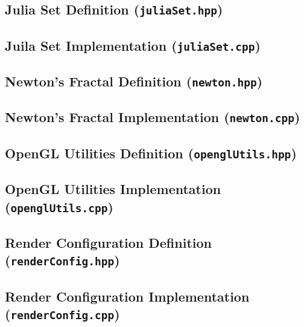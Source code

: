 \pagebreak

\subsection{Julia Set Definition (\texttt{juliaSet.hpp})}


\subsection{Juila Set Implementation (\texttt{juliaSet.cpp})}



\pagebreak

\subsection{Newton's Fractal Definition (\texttt{newton.hpp})}


\subsection{Newton's Fractal Implementation (\texttt{newton.cpp})}



\pagebreak

\subsection{OpenGL Utilities Definition (\texttt{openglUtils.hpp})}


\subsection{OpenGL Utilities Implementation (\texttt{openglUtils.cpp})}



\pagebreak

\subsection{Render Configuration Definition (\texttt{renderConfig.hpp})}


\subsection{Render Configuration Implementation (\texttt{renderConfig.cpp})}




